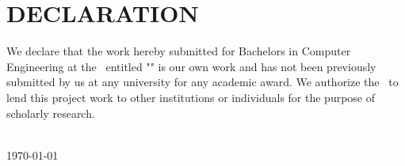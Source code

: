 \section*{DECLARATION}
\vspace{0.5cm}

We declare that the work hereby submitted for Bachelors in Computer Engineering at the \thecampus \ entitled "\textbf{\thetitle}" is our own work and has not been previously submitted by us at any university for any academic award.
We authorize the \thecampus \ to lend this project work
to other institutions or individuals for the purpose of scholarly research.

\vspace{1cm}
\noindent\textbf{{\theauthor}}\\

\vspace{0.7cm}
\noindent\today
